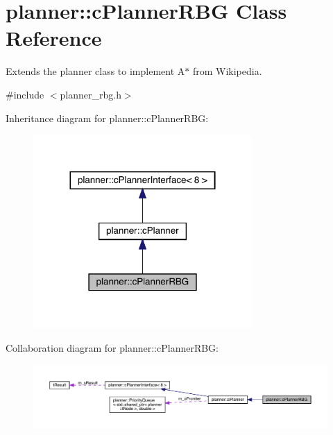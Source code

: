 \hypertarget{classplanner_1_1c_planner_r_b_g}{}\section{planner\+:\+:c\+Planner\+R\+BG Class Reference}
\label{classplanner_1_1c_planner_r_b_g}


Extends the planner class to implement A$\ast$ from Wikipedia.  




{\ttfamily \#include $<$planner\+\_\+rbg.\+h$>$}



Inheritance diagram for planner\+:\+:c\+Planner\+R\+BG\+:
\nopagebreak
\begin{figure}[H]
\begin{center}
\leavevmode
\includegraphics[width=236pt]{classplanner_1_1c_planner_r_b_g__inherit__graph}
\end{center}
\end{figure}


Collaboration diagram for planner\+:\+:c\+Planner\+R\+BG\+:
\nopagebreak
\begin{figure}[H]
\begin{center}
\leavevmode
\includegraphics[width=350pt]{classplanner_1_1c_planner_r_b_g__coll__graph}
\end{center}
\end{figure}
